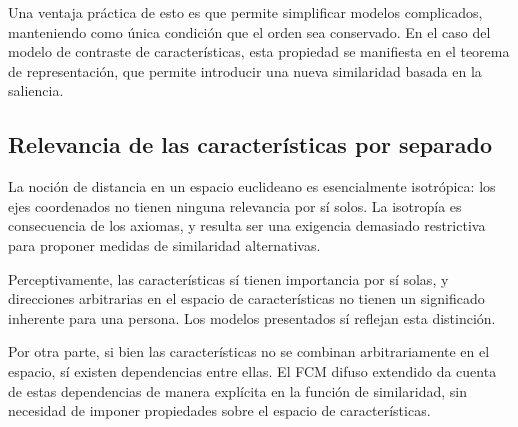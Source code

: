 \documentclass[spanish]{article}
\begin{document}
Una ventaja práctica de esto es que permite simplificar modelos complicados,
manteniendo como única condición que el orden sea conservado.  En el caso del
modelo de contraste de características, esta propiedad se manifiesta en el
teorema de representación, que permite introducir una nueva similaridad basada
en la saliencia.

\subsection{Relevancia de las características por separado}
La noción de distancia en un espacio euclideano es esencialmente isotrópica: los
ejes coordenados no tienen ninguna relevancia por sí solos.  La isotropía es
consecuencia de los axiomas, y resulta ser una exigencia demasiado restrictiva
para proponer medidas de similaridad alternativas.

Perceptivamente, las características sí tienen importancia por sí
solas, y direcciones arbitrarias en el espacio de características no tienen
un significado inherente para una persona.  Los modelos presentados sí reflejan
esta distinción.

Por otra parte, si bien las características no se combinan arbitrariamente en el
espacio, sí existen dependencias entre ellas.  El FCM difuso extendido da cuenta
de estas dependencias de manera explícita en la función de similaridad, sin
necesidad de imponer propiedades sobre el espacio de características.




\end{document}
